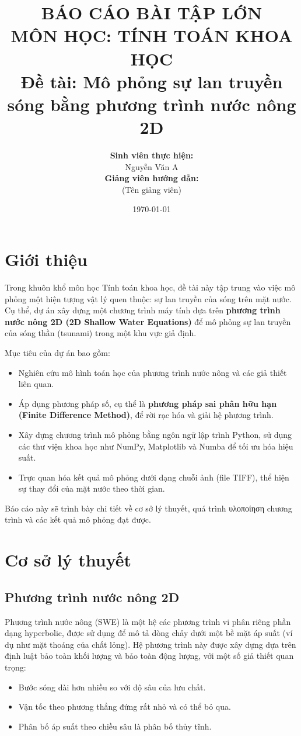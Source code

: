 \documentclass[12pt, a4paper]{article}
\title{
    \textbf{BÁO CÁO BÀI TẬP LỚN} \\
    \vspace{0.5cm}
    \large MÔN HỌC: TÍNH TOÁN KHOA HỌC \\
    \vspace{1.5cm}
    \textbf{Đề tài: Mô phỏng sự lan truyền sóng bằng phương trình nước nông 2D}
}
\author{
    \textbf{Sinh viên thực hiện:} \\
    Nguyễn Văn A \\
    \vspace{1cm}
    \textbf{Giảng viên hướng dẫn:} \\
    (Tên giảng viên)
}
\date{\today}
\begin{document}
\maketitle
\thispagestyle{empty}

\newpage
\tableofcontents
\thispagestyle{empty}

\newpage
\setcounter{page}{1}

\section{Giới thiệu}
Trong khuôn khổ môn học Tính toán khoa học, đề tài này tập trung vào việc mô phỏng một hiện tượng vật lý quen thuộc: sự lan truyền của sóng trên mặt nước. Cụ thể, dự án xây dựng một chương trình máy tính dựa trên \textbf{phương trình nước nông 2D (2D Shallow Water Equations)} để mô phỏng sự lan truyền của sóng thần (tsunami) trong một khu vực giả định.

Mục tiêu của dự án bao gồm:
\begin{itemize}
    \item Nghiên cứu mô hình toán học của phương trình nước nông và các giả thiết liên quan.
    \item Áp dụng phương pháp số, cụ thể là \textbf{phương pháp sai phân hữu hạn (Finite Difference Method)}, để rời rạc hóa và giải hệ phương trình.
    \item Xây dựng chương trình mô phỏng bằng ngôn ngữ lập trình Python, sử dụng các thư viện khoa học như NumPy, Matplotlib và Numba để tối ưu hóa hiệu suất.
    \item Trực quan hóa kết quả mô phỏng dưới dạng chuỗi ảnh (file TIFF), thể hiện sự thay đổi của mặt nước theo thời gian.
\end{itemize}

Báo cáo này sẽ trình bày chi tiết về cơ sở lý thuyết, quá trình υλοποίηση chương trình và các kết quả mô phỏng đạt được.

\section{Cơ sở lý thuyết}
\subsection{Phương trình nước nông 2D}
Phương trình nước nông (SWE) là một hệ các phương trình vi phân riêng phần dạng hyperbolic, được sử dụng để mô tả dòng chảy dưới một bề mặt áp suất (ví dụ như mặt thoáng của chất lỏng). Hệ phương trình này được xây dựng dựa trên định luật bảo toàn khối lượng và bảo toàn động lượng, với một số giả thiết quan trọng:
\begin{itemize}
    \item Bước sóng dài hơn nhiều so với độ sâu của lưu chất.
    \item Vận tốc theo phương thẳng đứng rất nhỏ và có thể bỏ qua.
    \item Phân bố áp suất theo chiều sâu là phân bố thủy tĩnh.
\end{itemize}
\end{document}
